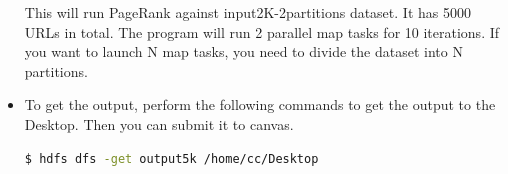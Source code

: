 \begin{itemize}
This will run PageRank against input2K-2partitions dataset. It has 5000 URLs in total. The program will run 2 parallel map tasks for 10 iterations.  If you want to launch N map tasks, you need to divide the dataset into N partitions.

\item To get the output, perform the following commands to get the output to the Desktop. Then you can submit it to canvas.
\begin{lstlisting}[language=bash]
$ hdfs dfs -get output5k /home/cc/Desktop
\end{lstlisting}
\end{itemize}
